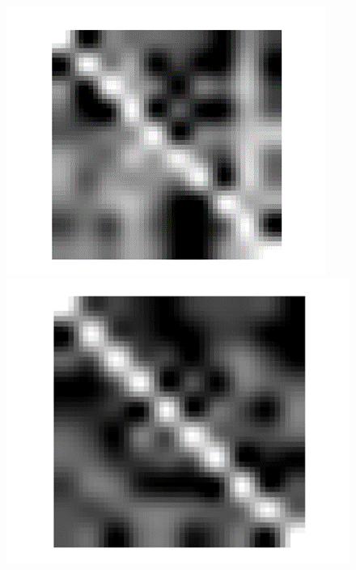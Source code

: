 \documentclass{article} %
\begin{document}
\begin{figure}[ht] 
  \label{fig:confusion_mats} 
  \begin{minipage}[b]{0.5\linewidth}
    \centering
    \includegraphics[width=\linewidth]{noneConfusionMat.png} 
    \vspace{4ex}
  \end{minipage}%
  \begin{minipage}[b]{0.5\linewidth}
    \centering
    \includegraphics[width=\linewidth]{randomConfusionMat.png} 

\end{minipage}
\end{figure}
\end{document}
